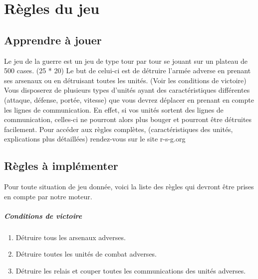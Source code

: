 \chapter{Règles du jeu}

		\section{Apprendre à jouer}
		
		Le jeu de la guerre est un jeu de type tour par tour se jouant sur un plateau de 500 cases. (25 * 20)
		Le but de celui-ci est de détruire l'armée adverse en prenant ses arsenaux ou en détruisant toutes les unités. (Voir les conditions de victoire)
		Vous disposerez de plusieurs types d'unités ayant des caractéristiques différentes (attaque, défense, portée, vitesse) que vous devrez déplacer 
		en prenant en compte les lignes de communication.
		En effet, si vos unités sortent des lignes de communication, celles-ci ne pourront alors plus bouger et pourront être détruites facilement.
		Pour accéder aux règles complètes, (caractéristiques des unités, explications plus détaillées) rendez-vous sur le site r-s-g.org~\cite{ref1}
		
		\section{Règles à implémenter}
		Pour toute situation de jeu donnée, voici la liste des règles qui devront être prises en compte par notre moteur.

		\paragraph{Conditions de victoire}
		\begin{enumerate}
		\item Détruire tous les arsenaux adverses.
		\item Détruire toutes les unités de combat adverses.
		\item Détruire les relais et couper toutes les communications des unités adverses.
		\end{enumerate}
		
